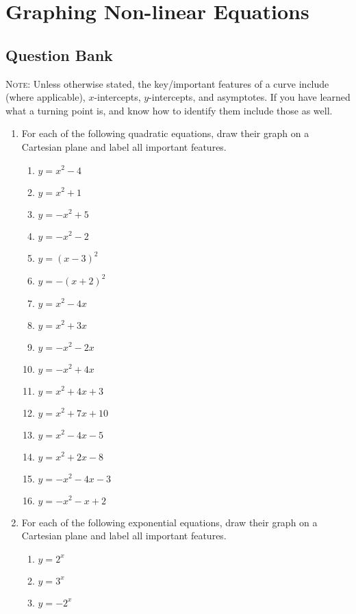 \documentclass[a4paper,12pt]{article}
\begin{document}
\large
\section*{Graphing Non-linear Equations}

\subsection*{Question Bank}

\textsc{Note}: Unless otherwise stated, the key/important features of a 
curve include (where applicable), $x$-intercepts, $y$-intercepts, and 
asymptotes. If you have learned what a turning point is, and know how to 
identify them include those as well.

\begin{enumerate}
\item For each of the following quadratic equations, draw their graph 
on a Cartesian plane and label all important features.
    \begin{multicols}{2}
    \begin{enumerate}
    \item $y = x^2 - 4$
    \item $y = x^2 + 1$
    \item $y = -x^2 + 5$
    \item $y = -x^2 - 2$
    \item $y = (x - 3)^2$
    \item $y = -(x + 2)^2$
    \item $y = x^2 - 4x$
    \item $y = x^2 + 3x$
    \item $y = -x^2 - 2x$
    \item $y = -x^2 + 4x$
    \item $y = x^2 + 4x + 3$
    \item $y = x^2 + 7x + 10$
    \item $y = x^2 - 4x - 5$
    \item $y = x^2 + 2x - 8$
    \item $y = -x^2 - 4x - 3$
    \item $y = -x^2 - x + 2$
    \end{enumerate}
    \end{multicols}

\item For each of the following exponential equations, draw their graph 
on a Cartesian plane and label all important features.
    \begin{multicols}{2}
    \begin{enumerate}
    \item $y = 2^x$
    \item $y = 3^x$
    \item $y = -2^x$
    \end{enumerate}
    \end{multicols}
\end{enumerate}

% 
\end{document}
